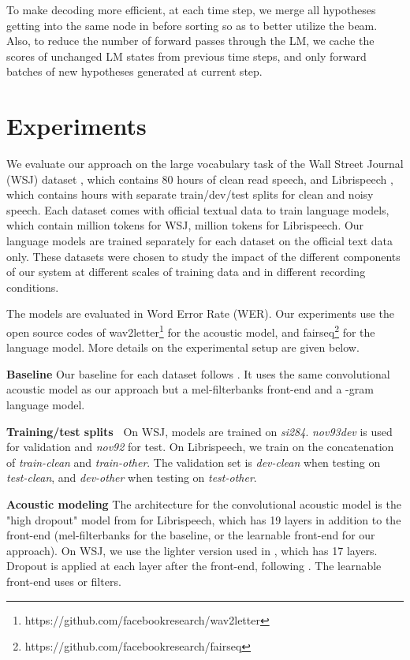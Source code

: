 \documentclass[a4paper]{article}
\begin{document}
To make decoding more efficient, at each time step, we merge all hypotheses getting into the same node in  before sorting so as to better utilize the beam. Also, to reduce the number of forward passes through the LM, we cache the scores of unchanged LM states from previous time steps, and only forward batches of new hypotheses generated at current step.



\section{Experiments}
\label{sec:experiments}
We evaluate our approach on the large vocabulary task of the Wall Street Journal (WSJ) dataset \cite{wsj}, which contains 80 hours of clean read speech, and Librispeech \cite{librispeech}, which contains  hours with separate train/dev/test splits for clean and noisy speech. Each dataset comes with official textual data to train language models, which contain  million tokens for WSJ,  million tokens for Librispeech. Our language models are trained separately for each dataset on the official text data only.
These datasets were chosen to study the impact of the different components of our system at different scales of training data and in different recording conditions. 

The models are evaluated in Word Error Rate (WER). Our experiments use the open source codes of wav2letter\footnote{https://github.com/facebookresearch/wav2letter} for the acoustic model, and fairseq\footnote{https://github.com/facebookresearch/fairseq} for the language model. More details on the experimental setup are given below. 

{\bf Baseline} Our baseline for each dataset follows \cite{wav2letter2}. It uses the same convolutional acoustic model as our approach but a mel-filterbanks front-end and a -gram language model.

{\bf Training/test splits~} On WSJ, models are trained on \textit{si284}. \textit{nov93dev} is used for validation and \textit{nov92} for test. On Librispeech, we train on the concatenation of \textit{train-clean} and {\it train-other}. The validation set is {\it dev-clean} when testing on {\it test-clean}, and {\it dev-other} when testing on {\it test-other}.

{\bf Acoustic modeling} The architecture for the convolutional acoustic model is the "high dropout" model from \cite{wav2letter2} for Librispeech, which has 19 layers in addition to the front-end (mel-filterbanks for the baseline, or the learnable front-end for our approach). On WSJ, we use the lighter version used in \cite{tdfbanks2}, which has 17 layers. Dropout is applied at each layer after the front-end, following \cite{wav2letter}. The learnable front-end uses  or  filters. 
\end{document}
